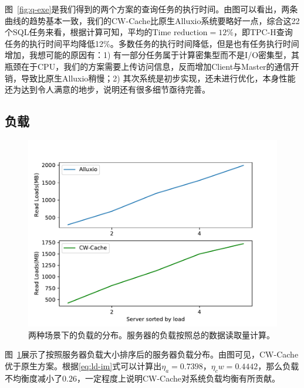 \par 图~\ref{fig:q-exe}是我们得到的两个方案的查询任务的执行时间。由图可以看出，两条曲线的趋势基本一致，我们的CW-Cache比原生Alluxio系统要略好一点，综合这22个SQL任务来看，根据计算可知，平均的$\textstyle \text{Time reduction} = 12\%$，即TPC-H查询任务的执行时间平均降低12\%。多数任务的执行时间降低，但是也有任务执行时间增加，我想可能的原因有：1) 有一部分任务属于计算密集型而不是I/O密集型，其瓶颈在于CPU，我们的方案需要上传访问信息，反而增加Client与Master的通信开销，导致比原生Alluxio稍慢；2) 其次系统是初步实现，还未进行优化，本身性能还为达到令人满意的地步，说明还有很多细节亟待完善。

\subsection{负载}

\begin{figure}[ht]
	\centering
	\includegraphics[width=0.70\paperwidth]{img/evaluation/server-load}
	\caption{两种场景下的负载的分布。服务器的负载按照总的数据读取量计算。}
	\label{fig:server-load}
\end{figure}

\par 图~\ref{fig:server-load}展示了按照服务器负载大小排序后的服务器负载分布。由图可见，CW-Cache优于原生方案。根据\eqref{eq:ld-im}式可以计算出$\eta_a = 0.7398$，$\eta_cw = 0.4442$，那么负载不均衡度减小了$0.26$，一定程度上说明CW-Cache对系统负载均衡有所贡献。

